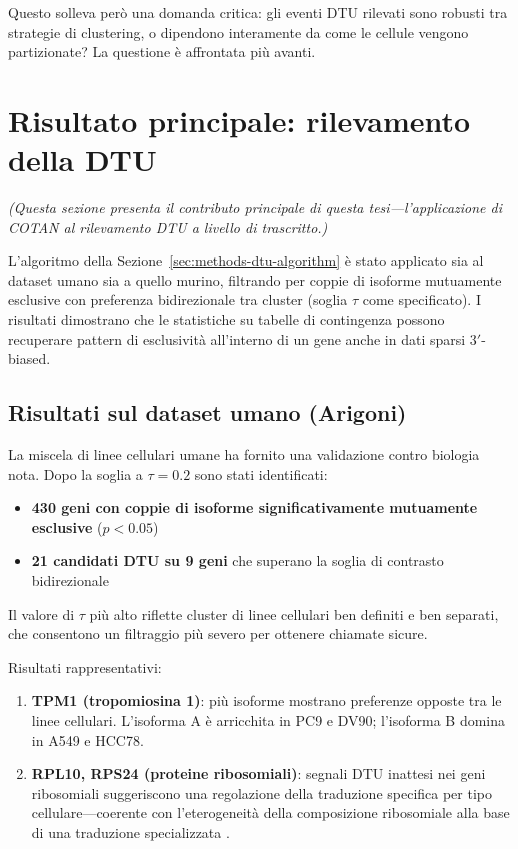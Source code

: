 Questo solleva però una domanda critica: gli eventi DTU rilevati sono robusti tra strategie di clustering, o dipendono interamente da come le cellule vengono partizionate? La questione è affrontata più avanti.

\section{Risultato principale: rilevamento della DTU}\label{sec:dtu-results}
\textit{(Questa sezione presenta il contributo principale di questa tesi---l'applicazione di COTAN al rilevamento DTU a livello di trascritto.)}

L'algoritmo della Sezione~\ref{sec:methods-dtu-algorithm} è stato applicato sia al dataset umano sia a quello murino, filtrando per coppie di isoforme mutuamente esclusive con preferenza bidirezionale tra cluster (soglia $\tau$ come specificato). I risultati dimostrano che le statistiche su tabelle di contingenza possono recuperare pattern di esclusività all'interno di un gene anche in dati sparsi $3'$-biased.

\subsection*{Risultati sul dataset umano (Arigoni)}\label{sec:results-human}

La miscela di linee cellulari umane ha fornito una validazione contro biologia nota. Dopo la soglia a $\tau = 0.2$ sono stati identificati:
\begin{itemize}
    \item \textbf{430 geni con coppie di isoforme significativamente mutuamente esclusive} ($p < 0.05$)
    \item \textbf{21 candidati DTU su 9 geni} che superano la soglia di contrasto bidirezionale
\end{itemize}

Il valore di $\tau$ più alto riflette cluster di linee cellulari ben definiti e ben separati, che consentono un filtraggio più severo per ottenere chiamate sicure.

Risultati rappresentativi:
\begin{enumerate}
    \item \textbf{TPM1 (tropomiosina 1)}: più isoforme mostrano preferenze opposte tra le linee cellulari. L'isoforma A è arricchita in PC9 e DV90; l'isoforma B domina in A549 e HCC78.
    
    \item \textbf{RPL10, RPS24 (proteine ribosomiali)}: segnali DTU inattesi nei geni ribosomiali suggeriscono una regolazione della traduzione specifica per tipo cellulare---coerente con l'eterogeneità della composizione ribosomiale alla base di una traduzione specializzata \cite{xue2012specialized}.
\end{enumerate}

